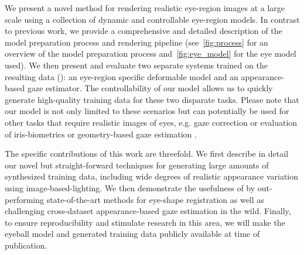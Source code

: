 


We present a novel method for rendering realistic eye-region images at a large scale using a collection of dynamic and controllable eye-region models.
In contrast to previous work, we provide a comprehensive and detailed description of the model preparation process and rendering pipeline (see~\autoref{fig:process} for an overview of the model preparation process and~\autoref{fig:eye_model} for the eye model used).
We then present and evaluate two separate systems trained on the resulting data (\emph{\dataset}): an eye-region specific deformable model and an appearance-based gaze estimator.
The controllability of our model allows us to quickly generate high-quality training data for these two disparate tasks.
Please note that our model is not only limited to these scenarios but can potentially be used for other tasks that require realistic images of eyes, e.g. gaze correction or evaluation of iris-biometrics or geometry-based gaze estimation \cite{swirski2014rendering}.

The specific contributions of this work are threefold.
%
We first describe in detail our novel but straight-forward techniques for generating large amounts of synthesized training data, including wide degrees of realistic appearance variation using image-based-lighting.
%
We then demonstrate the usefulness of \dataset by out-performing state-of-the-art methods for eye-shape registration as well as challenging cross-dataset appearance-based gaze estimation in the wild.
%
Finally, to ensure reproducibility and stimulate research in this area, we will make the eyeball model and generated training data publicly available at time of publication.